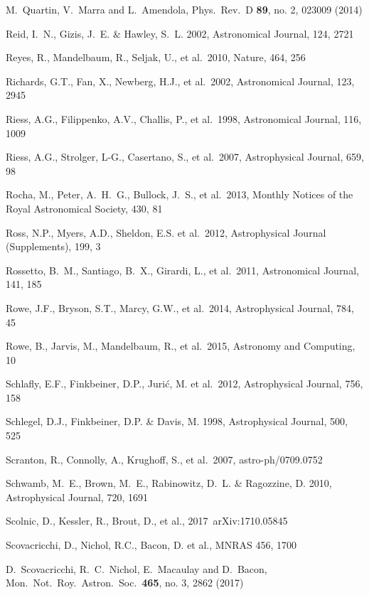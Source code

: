 \documentclass[twocolumn]{aastex61}
\begin{document}
\begin{thebibliography}{}
\bibitem[()]{} M.~Quartin, V.~Marra and L.~Amendola, Phys.\ Rev.\ D {\bf 89}, no. 2, 023009 (2014)

\bibitem[()]{} Reid, I.~N., Gizis, J.~E. \& Hawley, S.~L. 2002,  Astronomical Journal, 124, 2721

\bibitem[()]{} Reyes, R., Mandelbaum, R., Seljak, U., et al.~2010, Nature, 464, 256

\bibitem[()]{} Richards, G.T., Fan, X., Newberg, H.J., et al.~2002, Astronomical Journal, 123, 2945


\bibitem[()]{} Riess, A.G., Filippenko, A.V., Challis, P., et al.~1998, Astronomical Journal, 116, 1009

\bibitem[()]{} Riess, A.G., Strolger, L-G., Casertano, S., et al.~2007, Astrophysical Journal, 659, 98

\bibitem[()]{} Rocha, M., Peter, A.~H.~G., Bullock, J.~S., et al.\ 2013, Monthly Notices of the Royal Astronomical Society, 430, 81

\bibitem[()]{} Ross, N.P., Myers, A.D., Sheldon, E.S. et al.~2012,
  Astrophysical Journal (Supplements), 199, 3

\bibitem[()]{} Rossetto, B.~M., Santiago, B.~X., Girardi, L., et al.~2011, Astronomical Journal, 141, 185

\bibitem[()]{} Rowe, J.F., Bryson, S.T., Marcy, G.W., et al.~2014, Astrophysical Journal, 784, 45

\bibitem[()]{} Rowe, B., Jarvis, M., Mandelbaum, R., et al.~2015, Astronomy and Computing,  10

\bibitem[()]{} Schlafly, E.F., Finkbeiner, D.P., Juri\'c, M. et
  al.~2012, Astrophysical Journal, 756, 158

\bibitem[()]{} Schlegel, D.J., Finkbeiner, D.P. \& Davis, M. 1998, Astrophysical Journal, 500, 525

 Scranton, R., Connolly, A., Krughoff, S., et al.~2007, astro-ph/0709.0752

\bibitem[()]{} Schwamb, M.~E., Brown, M.~E., Rabinowitz, D.~L. \& Ragozzine, D. 2010, Astrophysical Journal, 720, 1691

\bibitem[()]{} Scolnic, D., Kessler, R., Brout, D., et al., 2017~arXiv:1710.05845

\bibitem[()]{} Scovacricchi, D., Nichol, R.C., Bacon, D. et al., MNRAS 456, 1700

\bibitem[()]{} D.~Scovacricchi, R.~C.~Nichol, E.~Macaulay and D.~Bacon, Mon.\ Not.\ Roy.\ Astron.\ Soc.\  {\bf 465}, no. 3, 2862 (2017)


\end{thebibliography}
\end{document}

